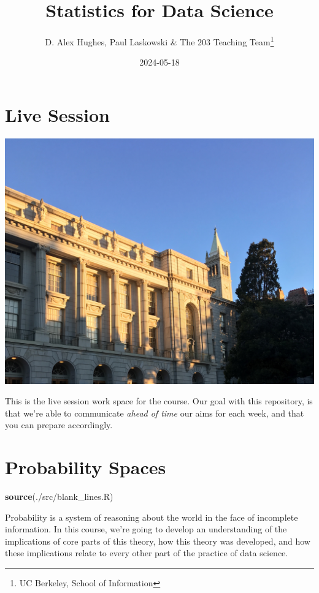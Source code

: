 \documentclass[
]{book}
\title{Statistics for Data Science}
\author{D. Alex Hughes, Paul Laskowski \& The 203 Teaching Team\footnote{UC Berkeley, School of Information}}
\date{2024-05-18}
\newenvironment{Shaded}{\begin{snugshade}}{\end{snugshade}}
\newcommand{\FunctionTok}[1]{\textcolor[rgb]{0.13,0.29,0.53}{\textbf{#1}}}
\newcommand{\NormalTok}[1]{#1}
\newcommand{\StringTok}[1]{\textcolor[rgb]{0.31,0.60,0.02}{#1}}
\theoremstyle{definition}
\theoremstyle{definition}
\theoremstyle{definition}
\theoremstyle{definition}
\theoremstyle{remark}
\begin{document}
\maketitle

{
\setcounter{tocdepth}{1}
\tableofcontents
}
\hypertarget{live-session}{%
\chapter*{Live Session}\label{live-session}}

\includegraphics{./images/campus.jpeg}

This is the live session work space for the course. Our goal with this repository, is that we're able to communicate \emph{ahead of time} our aims for each week, and that you can prepare accordingly.

\hypertarget{probability-spaces}{%
\chapter{Probability Spaces}\label{probability-spaces}}

\begin{Shaded}
\begin{Highlighting}[]
\FunctionTok{source}\NormalTok{(}\StringTok{\textquotesingle{}./src/blank\_lines.R\textquotesingle{}}\NormalTok{)}
\end{Highlighting}
\end{Shaded}

Probability is a system of reasoning about the world in the face of incomplete information. In this course, we're going to develop an understanding of the implications of core parts of this theory, how this theory was developed, and how these implications relate to every other part of the practice of data science.
\end{document}
